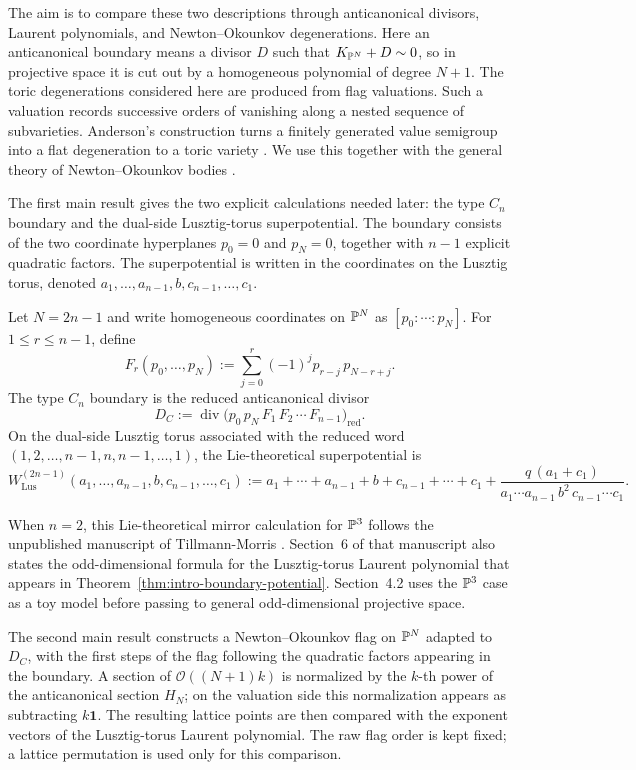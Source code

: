 The aim is to compare these two descriptions through anticanonical divisors, Laurent polynomials, and Newton--Okounkov degenerations. Here an anticanonical boundary means a divisor \(D\) such that \(K_{\mathbb{P}^N}+D\sim0\), so in projective space it is cut out by a homogeneous polynomial of degree \(N+1\). The toric degenerations considered here are produced from flag valuations. Such a valuation records successive orders of vanishing along a nested sequence of subvarieties. Anderson's construction turns a finitely generated value semigroup into a flat degeneration to a toric variety \cite{Anderson}. We use this together with the general theory of Newton--Okounkov bodies \cite{KK,LM}.

The first main result gives the two explicit calculations needed later: the type \(C_n\) boundary and the dual-side Lusztig-torus superpotential. The boundary consists of the two coordinate hyperplanes \(p_0=0\) and \(p_N=0\), together with \(n-1\) explicit quadratic factors. The superpotential is written in the coordinates on the Lusztig torus, denoted \(a_1,\ldots,a_{n-1},b,c_{n-1},\ldots,c_1\).

\begin{thm}\label{thm:intro-boundary-potential}
Let \(N=2n-1\) and write homogeneous coordinates on \(\mathbb{P}^N\) as \([p_0:\cdots:p_N]\).
For \(1\le r\le n-1\), define
\[
F_r(p_0,\dots,p_N):=\sum_{j=0}^r(-1)^j p_{r-j}\,p_{N-r+j}.
\]
The type \(C_n\) boundary is the reduced anticanonical divisor
\[
D_C
:=\operatorname{div}\bigl(p_0\,p_N\,F_1\,F_2\,\cdots\,F_{n-1}\bigr)_{\mathrm{red}} .
\]
On the dual-side Lusztig torus associated with the reduced word \((1,2,\dots,n-1,n,n-1,\dots,1)\), the Lie-theoretical superpotential is
\[
W_{\mathrm{Lus}}^{(2n-1)}(a_1,\dots,a_{n-1},b,c_{n-1},\dots,c_1)
:=
a_1+\cdots+a_{n-1}+b+c_{n-1}+\cdots+c_1
+
\frac{q\,(a_1+c_1)}{a_1\cdots a_{n-1}\,b^2\,c_{n-1}\cdots c_1}.
\]
\end{thm}

When \(n=2\), this Lie-theoretical mirror calculation for \(\mathbb{P}^3\) follows the unpublished manuscript of Tillmann-Morris \cite{TillmannMorris}. Section~6 of that manuscript also states the odd-dimensional formula for the Lusztig-torus Laurent polynomial that appears in Theorem~\ref{thm:intro-boundary-potential}. Section~4.2 uses the \(\mathbb{P}^3\) case as a toy model before passing to general odd-dimensional projective space.

The second main result constructs a Newton--Okounkov flag on \(\mathbb{P}^N\) adapted to \(D_C\), with the first steps of the flag following the quadratic factors appearing in the boundary. A section of \(\mathcal O((N+1)k)\) is normalized by the \(k\)-th power of the anticanonical section \(H_N\); on the valuation side this normalization appears as subtracting \(k\mathbf 1\). The resulting lattice points are then compared with the exponent vectors of the Lusztig-torus Laurent polynomial. The raw flag order is kept fixed; a lattice permutation is used only for this comparison.

